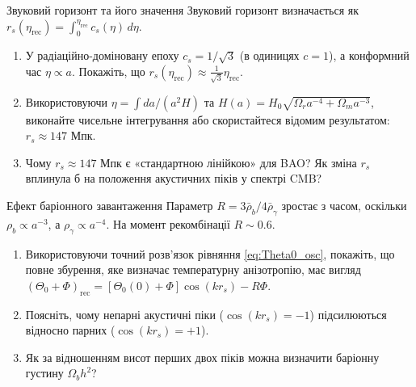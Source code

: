 
\begin{problem}{Звуковий горизонт та його значення}
Звуковий горизонт визначається як $r_s(\eta_{\text{rec}}) = \int_0^{\eta_{\text{rec}}} c_s(\eta)\,d\eta$.

\begin{enumerate}
    \item У радіаційно-доміновану епоху $c_s = 1/\sqrt{3}$ (в одиницях $c=1$),
          а конформний час $\eta \propto a$. Покажіть, що $r_s(\eta_{\text{rec}}) \approx \frac{1}{\sqrt{3}}\eta_{\text{rec}}$.
    \item Використовуючи $\eta = \int da/(a^2 H)$ та
          $H(a) = H_0 \sqrt{\Omega_r a^{-4} + \Omega_m a^{-3}}$,
          виконайте чисельне інтегрування або скористайтеся
          відомим результатом: $r_s \approx 147$ Мпк.
   \item Чому $r_s \approx 147$ Мпк є «стандартною лінійкою» для BAO?
          Як зміна $r_s$ вплинула б на положення акустичних піків у спектрі CMB?
\end{enumerate}
\end{problem}


\begin{problem}{Ефект баріонного завантаження}
Параметр $R = 3\bar\rho_b/4\bar\rho_\gamma$ зростає з часом, оскільки $\rho_b \propto a^{-3}$,
а $\rho_\gamma \propto a^{-4}$. На момент рекомбінації $R \sim 0.6$.

\begin{enumerate}
    \item Використовуючи точний розв'язок рівняння \eqref{eq:Theta0_osc},
          покажіть, що повне збурення, яке визначає температурну анізотропію,
          має вигляд $(\Theta_0 + \Phi)_{\text{rec}} = [\Theta_0(0)+\Phi]\cos(k r_s) - R\Phi$.
    \item Поясніть, чому непарні акустичні піки ($\cos(k r_s) = -1$)
          підсилюються відносно парних ($\cos(k r_s) = +1$).
    \item Як за відношенням висот перших двох піків можна визначити
          баріонну густину $\Omega_b h^2$?
\end{enumerate}
\end{problem}


